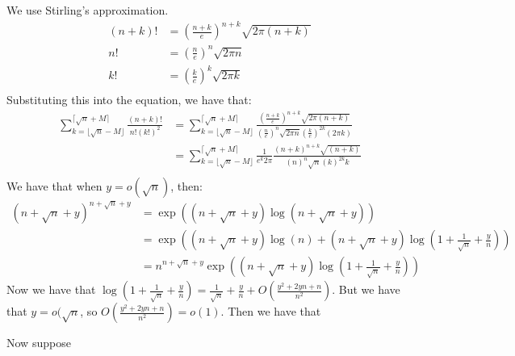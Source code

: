 \documentclass[]{article}
\begin{document}
We use Stirling's approximation.
\begin{align*}
	(n + k)! &= \left(\frac{n + k}{e}\right)^{n + k}\sqrt{2\pi (n + k)}\\
	n! &= \left(\frac{n}{e}\right)^n \sqrt{2 \pi n}\\
	k! &= \left(\frac{k}{e}\right)^k \sqrt{2 \pi k}\\
\end{align*}
Substituting this into the equation, we have that:
\begin{align*}
	\sum_{k = \lfloor \sqrt{n} - M \rfloor }^{ \lceil \sqrt{n} + M \rceil}  \frac{(n + k)!}{n!(k!)^2}
	&=
	\sum_{k = \lfloor \sqrt{n} - M \rfloor }^{ \lceil \sqrt{n} + M \rceil} \frac{\left(\frac{n + k}{e}\right)^{n + k}\sqrt{2\pi (n + k)}}{\left(\frac{n}{e}\right)^n \sqrt{2 \pi n} \left(\frac{k}{e}\right)^{2k} (2 \pi k)}\\
	&=
	\sum_{k = \lfloor \sqrt{n} - M \rfloor }^{ \lceil \sqrt{n} + M \rceil} \frac{1}{e^k 2\pi} \frac{\left(n + k\right)^{n + k}\sqrt{(n + k)}}{\left(n\right)^n \sqrt{n} \left(k\right)^{2k}k }\\
\end{align*}
We have that when $y = o(\sqrt{n})$, then:
\begin{align*}
	(n + \sqrt{n} + y)^{n + \sqrt{n} + y} &= \exp\left((n + \sqrt{n} + y) \log(n + \sqrt{n} + y)\right)\\
	&=
	\exp\left((n + \sqrt{n} + y) \log(n) +  (n + \sqrt{n} + y) \log (1 + \frac{1}{\sqrt{n}} + \frac{y}{n})\right)\\
	&=
	n^{n + \sqrt{n} + y} \exp\left((n + \sqrt{n} + y) \log(1 + \frac{1}{\sqrt{n}} + \frac{y}{n})
	\right)
\end{align*}
Now we have that $\log(1 + \frac{1}{\sqrt{n}} + \frac{y}{n}) = \frac{1}{\sqrt{n}} + \frac{y}{n} + O(\frac{y^2 + 2yn + n}{n^2})$. But we have that $y = o(\sqrt{n}$, so $O(\frac{y^2 + 2yn + n}{n^2}) = o(1)$. Then we have that 

Now suppose 
\end{document}
